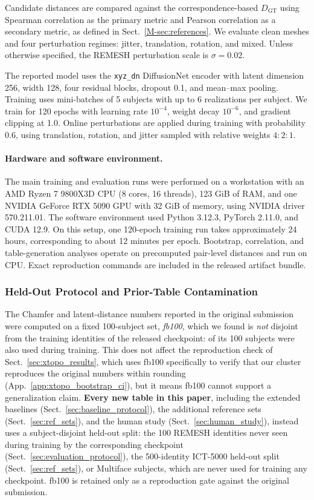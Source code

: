 Candidate distances are compared against the correspondence-based $D_{\mathrm{GT}}$ using Spearman correlation as the primary metric and Pearson correlation as a secondary metric, as defined in Sect.~\ref{M-sec:references}. We evaluate clean meshes and four perturbation regimes: jitter, translation, rotation, and mixed. Unless otherwise specified, the REMESH perturbation scale is $\sigma=0.02$.

The reported model uses the \texttt{xyz\_dn} DiffusionNet encoder with latent dimension 256, width 128, four residual blocks, dropout 0.1, and mean--max pooling. Training uses mini-batches of 5 subjects with up to 6 realizations per subject. We train for 120 epochs with learning rate $10^{-4}$, weight decay $10^{-6}$, and gradient clipping at 1.0. Online perturbations are applied during training with probability 0.6, using translation, rotation, and jitter sampled with relative weights $4{:}2{:}1$.

\paragraph{Hardware and software environment.}
The main training and evaluation runs were performed on a workstation with an AMD Ryzen 7 9800X3D CPU
(8 cores, 16 threads), 123 GiB of RAM, and one NVIDIA GeForce RTX 5090 GPU
with 32 GiB of memory, using NVIDIA driver 570.211.01. The software environment
used Python 3.12.3, PyTorch 2.11.0, and CUDA 12.9. On this setup, one 120-epoch
training run takes approximately 24 hours, corresponding to about 12 minutes per
epoch. Bootstrap, correlation, and table-generation analyses operate on
precomputed pair-level distances and run on CPU. Exact reproduction commands are
included in the released artifact bundle.

\subsubsection{Held-Out Protocol and Prior-Table Contamination}
\label{sec:heldout_contamination}
The Chamfer and latent-distance numbers reported in the original submission were computed on a fixed 100-subject set, \emph{fb100}, which we found is \emph{not} disjoint from the training identities of the released checkpoint:  of its 100 subjects were also used during training. This does not affect the reproduction check of Sect.~\ref{sec:xtopo_results}, which uses fb100 specifically to verify that our cluster reproduces the original numbers within rounding (App.~\ref{app:xtopo_bootstrap_ci}), but it means fb100 cannot support a generalization claim. \textbf{Every new table in this paper}, including the extended baselines (Sect.~\ref{sec:baseline_protocol}), the additional reference sets (Sect.~\ref{sec:ref_sets}), and the human study (Sect.~\ref{sec:human_study}), instead uses a subject-disjoint held-out split: the 100 REMESH identities never seen during training by the corresponding checkpoint (Sect.~\ref{sec:evaluation_protocol}), the 500-identity ICT-5000 held-out split (Sect.~\ref{sec:ref_sets}), or Multiface subjects, which are never used for training any checkpoint. fb100 is retained only as a reproduction gate against the original submission.

